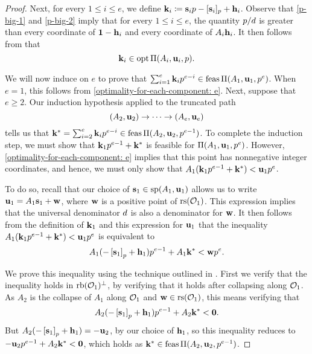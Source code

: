 \documentclass{amsart}
\begin{document}
\begin{proof}
    Next, for every $1 \leq i \leq e$,  we define $\mathbf{k}_i \coloneqq \mathbf{s}_i p - [\mathbf{s}_i]_p + \mathbf{h}_i$.
    Observe that \eqref{p-big-1} and \eqref{p-big-2} imply that for every $1 \leq i \leq e$, the quantity $p/d$ is greater than every coordinate of $\mathbf{1}-\mathbf{h}_i$ and every coordinate of $A_i \mathbf{h}_i$.
    It then follows from  that
    \begin{equation}
       \label{optimality-for-each-component: e}
       \mathbf{k}_i \in \operatorname{opt} \Pi(A_i, \mathbf{u}_i,p).
    \end{equation}

    We will now induce on $e$ to prove that $\sum_{i=1}^e \mathbf{k}_i p^{e-i} \in \operatorname{feas}\Pi(A_1, \mathbf{u}_1, p^e)$.
    When $e = 1$, this follows from \eqref{optimality-for-each-component: e}.
    Next, suppose that $e \geq 2$.
    Our induction hypothesis applied to the truncated path
    \[ (A_2, \mathbf{u}_2) \to \cdots \to (A_e, \mathbf{u}_e) \]
    tells us that $\mathbf{k}^{\ast} = \sum_{i=2}^e \mathbf{k}_i p^{e-i} \in \operatorname{feas} \Pi(A_2, \mathbf{u}_2, p^{e-1})$.
    To complete the induction step, we must show that $\mathbf{k}_1 p^{e-1} + \mathbf{k}^{\ast}$ is feasible for $\Pi(A_1, \mathbf{u}_1, p^e)$.
    However, \eqref{optimality-for-each-component: e} implies that this point has nonnegative integer coordinates, and hence, we must only show that $A_1 ( \mathbf{k}_1 p^{e-1} + \mathbf{k}^{\ast} ) < \mathbf{u}_1 p^e$.

    To do so, recall that our choice of $\mathbf{s}_1 \in \operatorname{sp}(A_1, \mathbf{u}_1)$ allows us to write $\mathbf{u}_1 = A_1 \mathbf{s}_1 + \mathbf{w}$, where $\mathbf{w}$ is a positive point of $\operatorname{rs}(\mathcal{O}_1)$.
    This expression implies that the universal denominator $d$ is also a denominator for $\mathbf{w}$.
    It then follows from the definition of $\mathbf{k}_1$ and this expression for $\mathbf{u}_1$ that the inequality $A_1 ( \mathbf{k}_1 p^{e-1} + \mathbf{k}^{\ast} ) < \mathbf{u}_1 p^e$ is equivalent to
    \begin{equation}
       \label{target-inequality: e}
       A_1( - \left[ \mathbf{s}_1 \right]_p + \mathbf{h}_1 ) p^{e-1} + A_1\mathbf{k}^{\ast} < \mathbf{w} p^e.
    \end{equation}

    We prove this inequality using the technique outlined in .
    First we verify that the inequality holds in $\operatorname{rb}(\mathcal{O}_1)^{\perp}$, by verifying that it holds after collapsing along $\mathcal{O}_1$.
    As $A_2$ is the collapse of $A_1$ along $\mathcal{O}_1$ and $\mathbf{w}\in \operatorname{rs}(\mathcal{O}_1)$, this means verifying that
    \[A_2( - \left[ \mathbf{s}_1 \right]_p + \mathbf{h}_1 ) p^{e-1} + A_2\mathbf{k}^{\ast} < \mathbf{0}.\]
    But $A_2( - \left[ \mathbf{s}_1 \right]_p + \mathbf{h}_1 ) = -\mathbf{u}_2$, by our choice of $\mathbf{h}_1$, so this inequality reduces to $-\mathbf{u}_2 p^{e-1} + A_2 \mathbf{k}^{\ast} < \mathbf{0}$, which holds as $\mathbf{k}^{\ast} \in \operatorname{feas} \Pi(A_2, \mathbf{u}_2, p^{e-1})$.


\end{proof}
\end{document}
